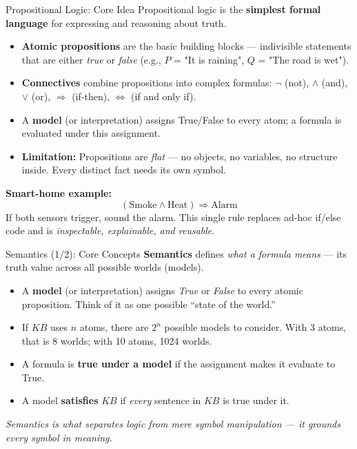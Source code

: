 \documentclass[10pt]{beamer}
\begin{document}
\begin{frame}{Propositional Logic: Core Idea}
    Propositional logic is the \textbf{simplest formal language} for expressing and reasoning about truth.
    \begin{itemize}
        \item \textbf{Atomic propositions} are the basic building blocks — indivisible statements that are either \emph{true} or \emph{false} (e.g., $P$ = "It is raining", $Q$ = "The road is wet").
        \item \textbf{Connectives} combine propositions into complex formulas:
            $\neg$ (not), $\land$ (and), $\lor$ (or), $\Rightarrow$ (if-then), $\Leftrightarrow$ (if and only if).
        \item A \textbf{model} (or interpretation) assigns True/False to every atom; a formula is evaluated under this assignment.
        \item \textbf{Limitation:} Propositions are \emph{flat} — no objects, no variables, no structure inside. Every distinct fact needs its own symbol.
    \end{itemize}
    \vspace{0.15cm}
    \textbf{Smart-home example:}
    \[
        (\text{Smoke} \land \text{Heat}) \Rightarrow \text{Alarm}
    \]
    If both sensors trigger, sound the alarm. This single rule replaces ad-hoc 
    if/else code and is \emph{inspectable, explainable, and reusable}.
\end{frame}

\begin{frame}{Semantics (1/2): Core Concepts}
    \textbf{Semantics} defines \emph{what a formula means} — its truth value across all possible worlds (models).

    \vspace{0.2cm}
    \begin{itemize}
        \item A \textbf{model} (or interpretation) assigns \emph{True} or \emph{False} to every atomic proposition.
              Think of it as one possible ``state of the world.''
        \item If $KB$ uses $n$ atoms, there are $2^n$ possible models to consider.
              With 3 atoms, that is 8 worlds; with 10 atoms, 1024 worlds.
        \item A formula is \textbf{true under a model} if the assignment makes it evaluate to True.
        \item A model \textbf{satisfies} $KB$ if \emph{every} sentence in $KB$ is true under it.
    \end{itemize}

    \vspace{0.3cm}
    \textit{Semantics is what separates logic from mere symbol manipulation — it grounds every symbol in meaning.}
\end{frame}
\end{document}
